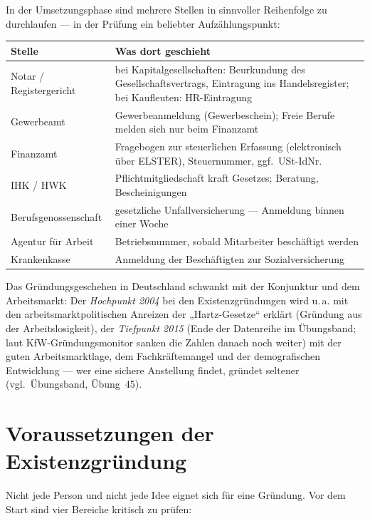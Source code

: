 \documentclass[11pt, a4paper]{article}
\begin{document}
In der Umsetzungsphase sind mehrere Stellen in sinnvoller Reihenfolge zu durchlaufen ---
in der Prüfung ein beliebter Aufzählungspunkt:

\begin{center}
\small
\begin{tabular}{p{4.6cm} p{9.6cm}}
\toprule
\rowcolor{bfwTabHead}\textbf{Stelle} & \textbf{Was dort geschieht}\\
\midrule
Notar / Registergericht & bei Kapitalgesellschaften: Beurkundung des Gesellschaftsvertrags, Eintragung ins Handelsregister; bei Kaufleuten: HR-Eintragung\\
\addlinespace
Gewerbeamt & Gewerbeanmeldung (Gewerbeschein); Freie Berufe melden sich nur beim Finanzamt\\
\addlinespace
Finanzamt & Fragebogen zur steuerlichen Erfassung (elektronisch über ELSTER), Steuernummer, ggf.\ USt-IdNr.\\
\addlinespace
IHK / HWK & Pflichtmitgliedschaft kraft Gesetzes; Beratung, Bescheinigungen\\
\addlinespace
Berufsgenossenschaft & gesetzliche Unfallversicherung --- Anmeldung binnen einer Woche\\
\addlinespace
Agentur für Arbeit & Betriebsnummer, sobald Mitarbeiter beschäftigt werden\\
\addlinespace
Krankenkasse & Anmeldung der Beschäftigten zur Sozialversicherung\\
\bottomrule
\end{tabular}
\end{center}

\begin{beispiel}
Das Gründungsgeschehen in Deutschland schwankt mit der Konjunktur und dem Arbeitsmarkt:
Der \emph{Hochpunkt 2004} bei den Existenzgründungen wird u.\,a. mit den
arbeitsmarktpolitischen Anreizen der „Hartz-Gesetze`` erklärt (Gründung aus der
Arbeitslosigkeit), der \emph{Tiefpunkt 2015} (Ende der Datenreihe im Übungsband; laut KfW-Gründungsmonitor
sanken die Zahlen danach noch weiter) mit der guten Arbeitsmarktlage, dem
Fachkräftemangel und der demografischen Entwicklung --- wer eine sichere Anstellung
findet, gründet seltener (vgl.\ Übungsband, Übung~45).
\end{beispiel}

\section{Voraussetzungen der Existenzgründung}

Nicht jede Person und nicht jede Idee eignet sich für eine Gründung. Vor dem Start sind
vier Bereiche kritisch zu prüfen:
\end{document}
